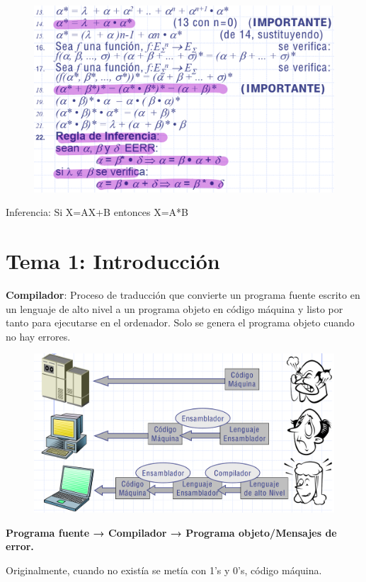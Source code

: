 \documentclass[12pt, twoside, openright]{report} %
\begin{document}
\begin{figure}[H]
	{\includegraphics[scale=.3]{Untitled 7.png}}
\end{figure}

Inferencia: Si X=AX+B entonces X=A*B

\chapter{Tema 1: Introducción}

\textbf{Compilador}: Proceso de traducción que convierte un programa
fuente escrito en un lenguaje de alto nivel a un programa objeto en
código máquina y listo por tanto para ejecutarse en el ordenador. Solo
se genera el programa objeto cuando no hay errores.

\begin{figure}[H]
	{\includegraphics[scale=.25]{Untitled 8.png}}
\end{figure}

\textbf{Programa fuente → Compilador → Programa objeto/Mensajes de
error.}

Originalmente, cuando no existía se metía con 1's y 0's, código máquina.
\end{document}
